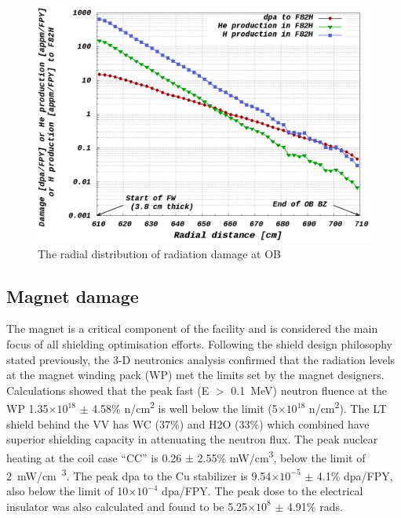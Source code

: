\documentclass[12pt, letterpaper]{elsarticle}
\begin{document}
\begin{figure}[h!]
  \centering
  \includegraphics[scale=0.2]{../plots/radialdamage.png}
  \caption{The radial distribution of radiation damage at OB}
  \label{fig:Radial Damage}
\end{figure}

\subsection{Magnet damage} \label{Magnet damage}
\providecommand{\e}[1]{\ensuremath{\times 10^{#1}}}
The magnet is a critical component of the facility and is considered the main focus of all shielding optimisation efforts. Following the shield design philosophy stated previously, the 3-D neutronics analysis confirmed that the radiation levels at the magnet winding pack (WP) met the limits set by the magnet designers. Calculations showed that the peak fast (E $>$ \SI{0.1}{MeV}) neutron fluence at the WP 1.35\e{18} $\pm$ 4.58\% n/cm\textsuperscript{2} is well below the limit (5\e{18} n/cm\textsuperscript{2}). The LT shield behind the VV has WC (37\%) and H2O (33\%) which combined have superior shielding capacity in attenuating the neutron flux. The peak nuclear heating at the coil case “CC” is 0.26 $\pm$ 2.55\% mW/cm\textsuperscript{3}, below the limit of \SI{2}{mW/cm\textsuperscript{3}}. The peak dpa to the Cu stabilizer is 9.54\e{-5} $\pm$ 4.1\% dpa/FPY, also below the limit of 10\e{-4} dpa/FPY. The peak dose to the electrical insulator was also calculated and found to be 5.25\e{8} $\pm$ 4.91\% rads.
\end{document}
